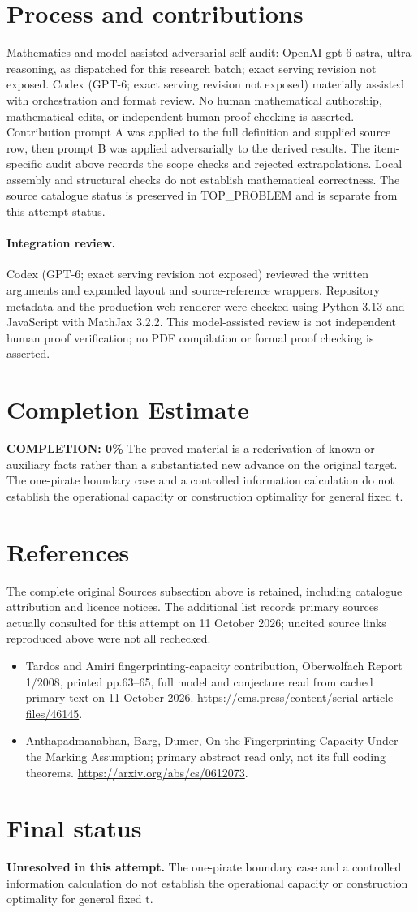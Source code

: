 \documentclass[11pt]{article}
\begin{document}
\section{Process and contributions}
Mathematics and model-assisted adversarial self-audit: OpenAI gpt-6-astra, ultra reasoning, as dispatched for this research batch; exact serving revision not exposed. Codex (GPT-6; exact serving revision not exposed) materially assisted with orchestration and format review. No human mathematical authorship, mathematical edits, or independent human proof checking is asserted.
Contribution prompt A was applied to the full definition and supplied source row, then prompt B was applied adversarially to the derived results. The item-specific audit above records the scope checks and rejected extrapolations. Local assembly and structural checks do not establish mathematical correctness. The source catalogue status is preserved in TOP\_PROBLEM and is separate from this attempt status.
\paragraph{Integration review.} Codex (GPT-6; exact serving revision not exposed) reviewed the written arguments and expanded layout and source-reference wrappers. Repository metadata and the production web renderer were checked using Python 3.13 and JavaScript with MathJax 3.2.2. This model-assisted review is not independent human proof verification; no PDF compilation or formal proof checking is asserted.

\section{Completion Estimate}
\noindent\textbf{COMPLETION: 0\%}
The proved material is a rederivation of known or auxiliary facts rather than a substantiated new advance on the original target. The one-pirate boundary case and a controlled information calculation do not establish the operational capacity or construction optimality for general fixed t.
\section{References}
The complete original Sources subsection above is retained, including catalogue attribution and licence notices. The additional list records primary sources actually consulted for this attempt on 11 October 2026; uncited source links reproduced above were not all rechecked.
\begin{itemize}
\item Tardos and Amiri fingerprinting-capacity contribution, Oberwolfach Report 1/2008, printed pp.63--65, full model and conjecture read from cached primary text on 11 October 2026. \url{https://ems.press/content/serial-article-files/46145}.
\item Anthapadmanabhan, Barg, Dumer, On the Fingerprinting Capacity Under the Marking Assumption; primary abstract read only, not its full coding theorems. \url{https://arxiv.org/abs/cs/0612073}.
\end{itemize}
\section{Final status}
\textbf{Unresolved in this attempt.} The one-pirate boundary case and a controlled information calculation do not establish the operational capacity or construction optimality for general fixed t.
\end{document}
